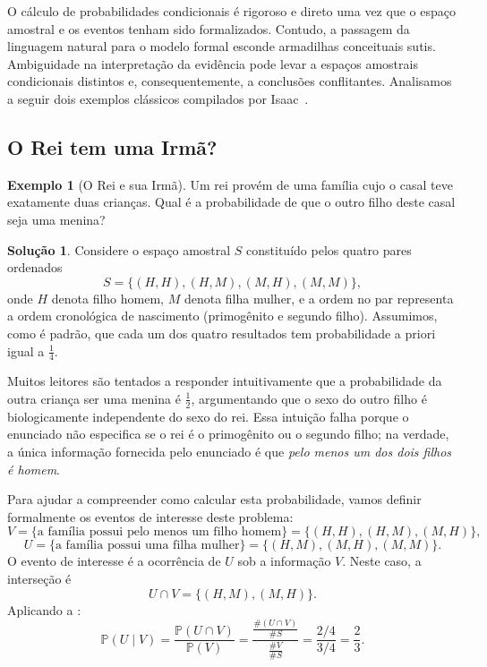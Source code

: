 \documentclass[12pt,portuguese]{article}
\theoremstyle{definition}
\newtheorem{example}[example]{Exemplo}
\newtheorem*{solution}{Solução}
\begin{document}
O cálculo de probabilidades condicionais é rigoroso e direto uma vez que o espaço amostral e os eventos tenham sido formalizados. Contudo, a passagem da linguagem natural para o modelo formal esconde armadilhas conceituais sutis. Ambiguidade na interpretação da evidência pode levar a espaços amostrais condicionais distintos e, consequentemente, a conclusões conflitantes. Analisamos a seguir dois exemplos clássicos compilados por Isaac~\cite{Isaac1995}.

\subsection{O Rei tem uma Irmã?}

\begin{example}[O Rei e sua Irmã]\label{ex:rei}
Um rei provém de uma família cujo o casal teve exatamente duas crianças. 
Qual é a probabilidade de que o outro filho deste casal seja uma menina?
\end{example}

\begin{solution}
Considere o espaço amostral \(S\) constituído pelos quatro pares ordenados
\[
  S = \{(H,H), (H,M), (M,H), (M,M)\},
\]
onde \(H\) denota filho homem, \(M\) denota filha mulher, e a ordem no par representa a ordem cronológica de nascimento (primogênito e segundo filho). Assumimos, como é padrão, que cada um dos quatro resultados tem probabilidade a priori igual a \(\frac{1}{4}\).


\medskip 
Muitos leitores são tentados a responder intuitivamente que a probabilidade 
da outra criança ser uma menina é \(\frac{1}{2}\), argumentando que o sexo do outro 
filho é biologicamente independente do sexo do rei. 
Essa intuição falha porque o enunciado não especifica se o rei é o primogênito ou o segundo filho; na verdade, a única informação fornecida pelo enunciado é que \emph{pelo menos um dos dois filhos é homem}.

Para ajudar a compreender como calcular esta probabilidade, vamos definir formalmente os eventos
de interesse deste problema: 
\[
  V = \{\text{a família possui pelo menos um filho homem}\} = \{(H,H), (H,M), (M,H)\},
\]
\[
  U = \{\text{a família possui uma filha mulher}\} = \{(H,M), (M,H), (M,M)\}.
\]
O evento de interesse é a ocorrência de \(U\) sob a informação \(V\). 
Neste caso, a interseção é
\[
  U \cap V = \{(H,M), (M,H)\}.
\]
Aplicando a :
\[
  \mathbb{P}(U \mid V) 
  = 
  \frac{\mathbb{P}(U \cap V)}{\mathbb{P}(V)} 
  = 
  \frac{ \displaystyle\frac{\#(U \cap V)}{\# S}  }{ \displaystyle \frac{\#V}{\# S}} = \frac{2/4}{3/4} = \frac{2}{3}.
\]
\end{solution}
\end{document}
